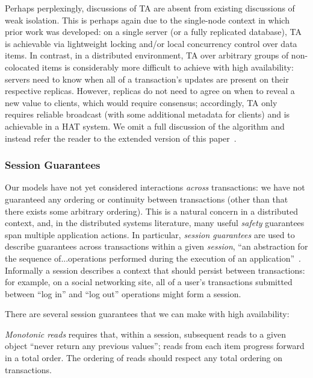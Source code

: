 Perhaps perplexingly, discussions of TA are absent from existing
discussions of weak isolation. This is perhaps again due to the
single-node context in which prior work was developed: on a single
server (or a fully replicated database), TA is achievable via
lightweight locking and/or local concurrency control over data
items. In contrast, in a distributed environment, TA over arbitrary
groups of non-colocated items is considerably more difficult to
achieve with high availability: servers need to know when all of a
transaction's updates are present on their respective
replicas. However, replicas do not need to agree on when to reveal a
new value to clients, which would require consensus; accordingly, TA
only requires reliable broadcast (with some additional metadata for
clients) and is achievable in a HAT system. We omit a full discussion
of the algorithm and instead refer the reader to the extended version
of this paper~\cite{hat-tr}.

\subsubsection{Session Guarantees}

Our models have not yet considered interactions \textit{across}
transactions: we have not guaranteed any ordering or continuity
between transactions (other than that there exists some arbitrary
ordering). This is a natural concern in a distributed context, and, in
the distributed systems literature, many useful \textit{safety}
guarantees span multiple application actions. In particular,
\textit{session guarantees} are used to describe guarantees across
transactions within a given \textit{session}, ``an abstraction for the
sequence of...operations performed during the execution of an
application''~\cite{sessionguarantees}. Informally a session describes
a context that should persist between transactions: for example, on a
social networking site, all of a user's transactions submitted between
``log in'' and ``log out'' operations might form a session.

There are several session guarantees that we can make with high availability:

\vspace{.5em}\noindent\textit{{Monotonic reads}} requires that,
within a session, subsequent reads to a given object ``never return any
previous values''; reads from each item progress forward in a total
order. The ordering of reads should respect any total ordering on
transactions.

